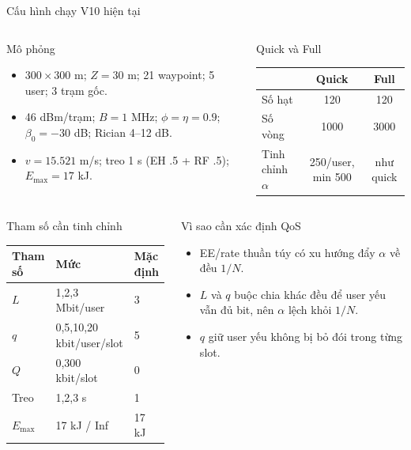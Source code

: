 \documentclass[t,aspectratio=169]{beamer}
\begin{document}
\begin{frame}{Cấu hình chạy V10 hiện tại}
  \begin{columns}[T]
  \begin{block}{Mô phỏng}\scriptsize
  \begin{itemize}\setlength{\itemsep}{2pt}
    \item $300\times300$ m; \(Z=30\) m; 21 waypoint; 5 user; 3 trạm gốc.
    \item 46 dBm/trạm; \(B=1\) MHz; \(\phi=\eta=0.9\); \(\beta_0=-30\) dB; Rician 4--12 dB.
    \item \(v=15.521\) m/s; treo 1 s (EH .5 + RF .5); \(E_{\max}=17\) kJ.
  \end{itemize}
  \end{block}
  \begin{block}{Quick và Full}\scriptsize
  \begin{tabular}{@{}l c c@{}}
    \toprule
    & \textbf{Quick} & \textbf{Full}\\
    \midrule
    Số hạt & 120 & 120\\
    Số vòng & 1000 & 3000\\
    Tinh chỉnh \(\alpha\) & 250/user, min 500 & như quick\\
    \bottomrule
  \end{tabular}
  \end{block}
  \end{columns}
  \vspace{-4pt}
  \begin{columns}[T]
  \begin{block}{Tham số cần tinh chỉnh}\scriptsize
  \renewcommand{\arraystretch}{0.95}
  \begin{tabular}{@{}l l l@{}}
    \toprule
    \textbf{Tham số} & \textbf{Mức} & \textbf{Mặc định}\\
    \midrule
    \(L\) & 1,2,3 Mbit/user & 3\\
    \(q\) & 0,5,10,20 kbit/user/slot & 5\\
    \(Q\) & 0,300 kbit/slot & 0\\
    Treo & 1,2,3 s & 1\\
    \(E_{\max}\) & 17 kJ / Inf & 17 kJ\\
    \bottomrule
  \end{tabular}
  \end{block}
  \begin{alertblock}{Vì sao cần xác định QoS}\scriptsize
  \begin{itemize}\setlength{\itemsep}{2pt}
    \item EE/rate thuần túy có xu hướng đẩy \(\alpha\) về đều \(1/N\).
    \item \(L\) và \(q\) buộc chia khác đều để user yếu vẫn đủ bit, nên \(\alpha\) lệch khỏi \(1/N\).
    \item \(q\) giữ user yếu không bị bỏ đói trong từng slot.
  \end{itemize}
  \end{alertblock}
  \end{columns}
\end{frame}
\end{document}

